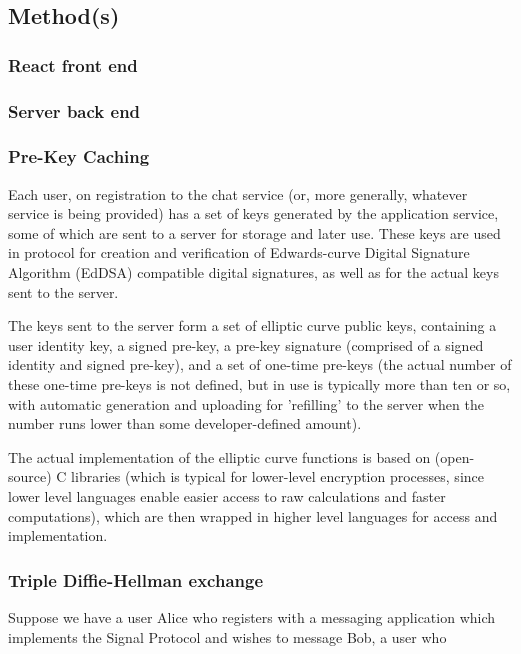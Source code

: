 \documentclass[12pt]{article}
\begin{document}
\newpage
\subsection{Method(s)}
\subsubsection{React front end}
\subsubsection{Server back end}
\subsubsection{Pre-Key Caching}
Each user, on registration to the chat service (or, more generally, whatever service is being provided) has a set of keys generated by the application service, some of which are sent to a server for storage and later use. These keys are used in protocol for creation and verification of Edwards-curve Digital Signature Algorithm (EdDSA) compatible digital signatures, as well as for the actual keys sent to the server. \parencite{website:sigdocXEdDSA} 
\par The keys sent to the server form a set of elliptic curve public keys, containing a user identity key, a signed pre-key, a pre-key signature (comprised of a signed identity and signed pre-key), and a set of one-time pre-keys (the actual number of these one-time pre-keys is not defined, but in use is typically more than ten or so, with automatic generation and uploading for 'refilling' to the server when the number runs lower than some developer-defined amount). \parencite{website:sigdocX3DH} 
\par The actual implementation of the elliptic curve functions is based on (open-source) C libraries (which is typical for lower-level encryption processes, since lower level languages enable easier access to raw calculations and faster computations), which are then wrapped in higher level languages for access and implementation. \parencite{website:prglibsigtypescriptCurve25519}\parencite{website:prglibsigtypescriptCurve25519rawC}

\subsubsection{Triple Diffie-Hellman exchange}
Suppose we have a user Alice who registers with a messaging application which implements the Signal Protocol and wishes to message Bob, a user who 
\end{document}

